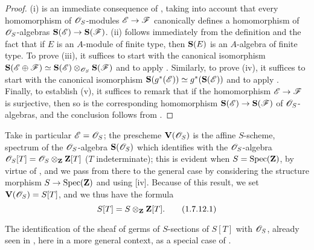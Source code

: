 \begin{proof}
\label{proof-2.1.7.11}
(i) is an immediate consequence of , taking into account that every homomorphism of $\mathscr{O}_S$-modules $\sh{E}\to\sh{F}$ canonically defines a homomorphism of $\mathscr{O}_S$-algebras $\bb{S}(\sh{E})\to\bb{S}(\sh{F})$.
(ii) follows immediately from the definition  and the fact that if $E$ is an $A$-module of finite type, then $\mathbf{S}(E)$ is an $A$-algebra of finite type.
To prove (iii), it suffices to start with the canonical isomorphism $\mathbf{S}(\mathscr{E}\oplus\mathscr{F})\simeq\mathbf{S}(\mathscr{E})\otimes_{\mathscr{O}_S}\mathbf{S}(\mathscr{F})$  and to apply .
Similarly, to prove (iv), it suffices to start with the canonical isomorphism $\mathbf{S}(g^*(\mathscr{E}))\simeq g^*(\mathbf{S}(\mathscr{E}))$  and to apply .
Finally, to establish (v), it suffices to remark that if the homomorphism $\sh{E}\to\sh{F}$ is surjective, then so is the corresponding homomorphism $\bb{S}(\sh{E})\to\bb{S}(\sh{F})$ of $\mathscr{O}_S$-algebras, and the conclusion follows from .
\end{proof}

\begin{env}[1.7.12]
\label{2.1.7.12}
Take in particular $\mathscr{E}=\mathscr{O}_S$; the prescheme $\mathbf{V}(\mathscr{O}_S)$ is the affine $S$-scheme, spectrum of the $\mathscr{O}_S$-algebra $\mathbf{S}(\mathscr{O}_S)$ which identifies with the $\mathscr{O}_S$-algebra $\mathscr{O}_S[T]=\mathscr{O}_S\otimes_\mathbf{Z}\mathbf{Z}[T]$
($T$ indeterminate); this is evident when $S=\operatorname{Spec}(\mathbf{Z})$, by virtue of , and we pass from there to the general case by considering the structure morphism $S\to\Spec(\bb{Z})$ and using [iv].
Because of this result, we set $\mathbf{V}(\mathscr{O}_S)=S[T]$, and we thus have the formula
\[
\label{eq:2.1.7.12.1}
  S[T]=S\otimes_\mathbf{Z}\mathbf{Z}[T].
  \tag{1.7.12.1}
\]

The identification of the sheaf of germs of $S$-sections of $S[T]$ with $\mathscr{O}_S$, already seen in , here in a more general context, as a special case of .
\end{env}

